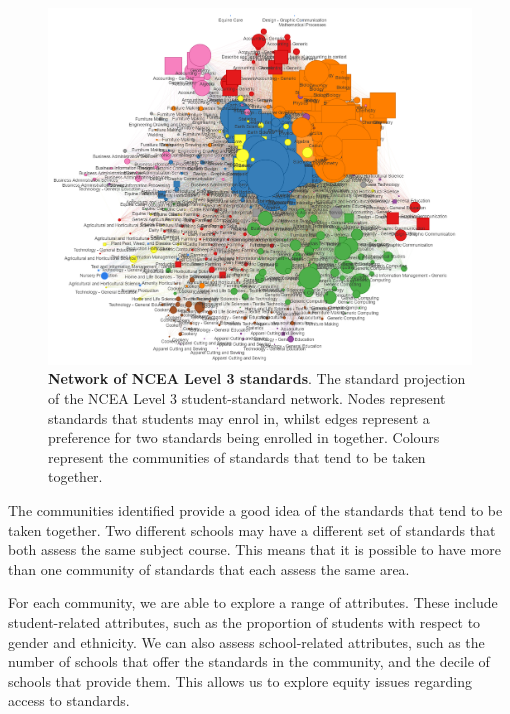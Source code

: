 \documentclass[a4paper]{article}
\begin{document}
\begin{landscape}
\begin{figure}
    \centering
    \includegraphics[width = \textwidth]{L3NCEA_STEM_Network_All.png}
    \caption{\textbf{Network of NCEA Level 3 standards}. The standard projection of the NCEA Level 3 student-standard network. Nodes represent standards that students may enrol in, whilst edges represent a preference for two standards being enrolled in together. Colours represent the communities of standards that tend to be taken together. }
    \label{fig:NetworkAll}
\end{figure}
\end{landscape}

The communities identified provide a good idea of the standards that tend to be taken together. Two different schools may have a different set of standards that both assess the same subject course. This means that it is possible to have more than one community of standards that each assess the same area.

For each community, we are able to explore a range of attributes. These include student-related attributes, such as the proportion of students with respect to gender and ethnicity. We can also assess school-related attributes, such as the number of schools that offer the standards in the community, and the decile of schools that provide them. This allows us to explore equity issues regarding access to standards. 
\end{document}
